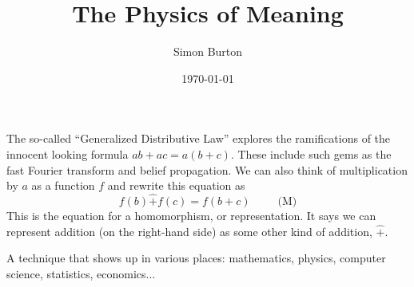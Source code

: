 \documentclass[11pt]{article}
\begin{document}
\title{The Physics of Meaning}

\author{Simon Burton}

\date{\today}


\maketitle


\def\N{\mathbb N}
\def\Z{\mathbb Z}
\def\R{\mathbb R}
\def\C{\mathbb C}
\def\Expect{\mathbb E}
\def\Ind{\mathbb I}
\def\Complex{\mathbb{C}}
\def\GL{\mathrm{GL}}
\def\half{\frac{1}{2}}
\def\todo#1{\emph{(XXX #1 XXX)}}


%
%


The so-called ``Generalized Distributive Law''
\cite{Aji2000}
explores the ramifications of the innocent looking
formula $ab+ac = a(b+c).$
These include such gems as the fast Fourier transform
and belief propagation.
We can also think of multiplication by $a$ as a function $f$
and rewrite this equation as 
$$
    f(b)\hat{+}f(c)=f(b+c) \ \ \ \ \ \ \ \ \ \ \ \mbox{(M)}
$$
This is the equation for a homomorphism, or representation.
It says we can represent addition (on the right-hand side)
as some other kind of addition, $\hat{+}.$

A technique that shows up in various places:
mathematics, physics, computer science, statistics, economics...

\end{document}
